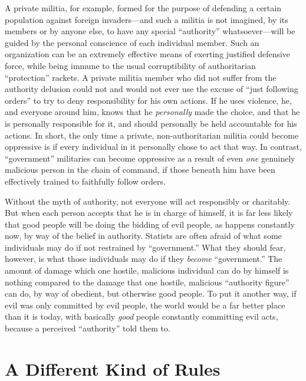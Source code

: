 \documentclass{book}
\begin{document}
A private militia, for example, formed for the purpose of defending a certain population against foreign invaders---and such a militia is not imagined, by its members or by anyone else, to have any special \enquote{authority} whatsoever---will be guided by the personal conscience of each individual member. Such an organization can be an extremely effective means of exerting justified defensive force, while being immune to the usual corruptibility of authoritarian \enquote{protection} rackets. A private militia member who did not suffer from the authority delusion could not and would not ever use the excuse of \enquote{just following orders} to try to deny responsibility for his own actions. If he uses violence, he, and everyone around him, knows that he \emph{personally} made the choice, and that he is personally responsible for it, and should personally be held accountable for his actions. In short, the only time a private, non-authoritarian militia could become oppressive is if every individual in it personally chose to act that way. In contrast, \enquote{government} militaries can become oppressive as a result of even \emph{one} genuinely malicious person in the chain of command, if those beneath him have been effectively trained to faithfully follow orders.

Without the myth of authority, not everyone will act responsibly or charitably. But when each person accepts that he is in charge of himself, it is far less likely that good people will be doing the bidding of evil people, as happens constantly now, by way of the belief in authority. Statists are often afraid of what some individuals may do if not restrained by \enquote{government.} What they should fear, however, is what those individuals may do if they \emph{become} \enquote{government.} The amount of damage which one hostile, malicious individual can do by himself is nothing compared to the damage that one hostile, malicious \enquote{authority figure} can do, by way of obedient, but otherwise good people. To put it another way, if evil was only committed by evil people, the world would be a far better place than it is today, with basically \emph{good} people constantly committing evil acts, because a perceived \enquote{authority} told them to.

\section{A Different Kind of Rules}
\end{document}
